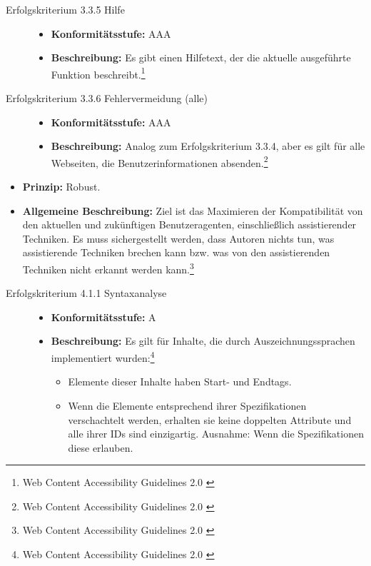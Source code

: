 \begin{description}
\begin{description}
		\item[Erfolgskriterium 3.3.5 Hilfe]\hfill
		\begin{itemize}
			\item \textbf{Konformitätsstufe:} AAA
			\item \textbf{Beschreibung:} Es gibt einen Hilfetext, der die aktuelle ausgeführte Funktion beschreibt.\footnote{Web Content Accessibility Guidelines 2.0 \cite{WCAG2.0}}
		\end{itemize}
		
		\item[Erfolgskriterium 3.3.6 Fehlervermeidung (alle)]\hfill
		\begin{itemize}
			\item \textbf{Konformitätsstufe:} AAA
			\item \textbf{Beschreibung:} Analog zum Erfolgskriterium 3.3.4, aber es gilt für alle Webseiten, die Benutzerinformationen 
			absenden.\footnote{Web Content Accessibility Guidelines 2.0 \cite{WCAG2.0}}
		\end{itemize}
	\end{description}

	\item[Richtlinie 4.1 Kompatibel]\hfill
	\begin{itemize}
		\item \textbf{Prinzip:} Robust.
		\item \textbf{Allgemeine Beschreibung:} Ziel ist das Maximieren der Kompatibilität von den aktuellen und zukünftigen Benutzeragenten, 
		einschließlich assistierender Techniken. Es muss sichergestellt werden, dass Autoren nichts tun, was assistierende Techniken brechen kann bzw. 
		was von den assistierenden Techniken nicht erkannt werden kann.\footnote{Web Content Accessibility Guidelines 2.0 \cite{WCAG2.0}}
	\end{itemize}
	
	\begin{description}
		\item[Erfolgskriterium 4.1.1 Syntaxanalyse]\hfill
		\begin{itemize}
			\item \textbf{Konformitätsstufe:} A
			\item \textbf{Beschreibung:} Es gilt für Inhalte, die durch Auszeichnungssprachen implementiert wurden:\footnote{Web Content Accessibility Guidelines 2.0 \cite{WCAG2.0}}
			\begin{itemize}
				\item Elemente dieser Inhalte haben Start- und Endtags.
				\item Wenn die Elemente entsprechend ihrer Spezifikationen verschachtelt werden, erhalten sie keine doppelten Attribute und alle ihrer
				 IDs sind einzigartig. Ausnahme: Wenn die Spezifikationen diese erlauben.
			\end{itemize}
		\end{itemize}
		

\end{description}
\end{description}
